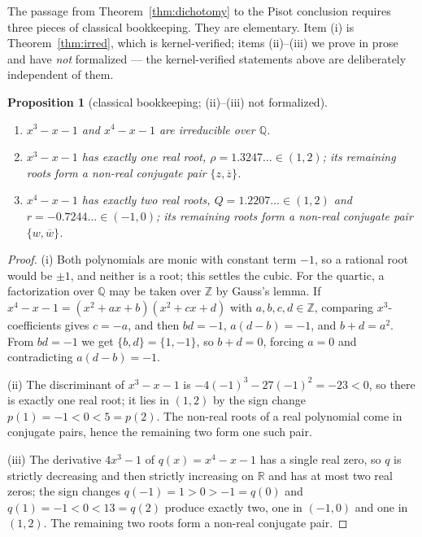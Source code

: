 \documentclass[11pt]{amsart}
\theoremstyle{plain}
\newtheorem{proposition}[theorem]{Proposition}
\theoremstyle{definition}
\theoremstyle{remark}
\begin{document}
The passage from Theorem~\ref{thm:dichotomy} to the Pisot conclusion requires three pieces of classical bookkeeping. They are elementary. Item (i) is Theorem~\ref{thm:irred}, which is kernel-verified; items (ii)--(iii) we prove in prose and have \emph{not} formalized --- the kernel-verified statements above are deliberately independent of them.

\begin{proposition}[classical bookkeeping; (ii)--(iii) not formalized]\label{prop:boundary-bookkeeping}
\begin{enumerate}
\item[(i)] $x^3 - x - 1$ and $x^4 - x - 1$ are irreducible over $\mathbb{Q}$.
\item[(ii)] $x^3 - x - 1$ has exactly one real root, $\rho = 1.3247\ldots \in (1, 2)$; its remaining roots form a non-real conjugate pair $\{z, \overline{z}\}$.
\item[(iii)] $x^4 - x - 1$ has exactly two real roots, $Q = 1.2207\ldots \in (1, 2)$ and $r = -0.7244\ldots \in (-1, 0)$; its remaining roots form a non-real conjugate pair $\{w, \overline{w}\}$.
\end{enumerate}
\end{proposition}

\begin{proof}
(i) Both polynomials are monic with constant term $-1$, so a rational root would be $\pm 1$, and neither is a root; this settles the cubic. For the quartic, a factorization over $\mathbb{Q}$ may be taken over $\mathbb{Z}$ by Gauss's lemma. If $x^4 - x - 1 = (x^2 + a x + b)(x^2 + c x + d)$ with $a, b, c, d \in \mathbb{Z}$, comparing $x^3$-coefficients gives $c = -a$, and then $b d = -1$, $a(d - b) = -1$, and $b + d = a^2$. From $b d = -1$ we get $\{b, d\} = \{1, -1\}$, so $b + d = 0$, forcing $a = 0$ and contradicting $a(d - b) = -1$.

(ii) The discriminant of $x^3 - x - 1$ is $-4(-1)^3 - 27(-1)^2 = -23 < 0$, so there is exactly one real root; it lies in $(1, 2)$ by the sign change $p(1) = -1 < 0 < 5 = p(2)$. The non-real roots of a real polynomial come in conjugate pairs, hence the remaining two form one such pair.

(iii) The derivative $4x^3 - 1$ of $q(x) = x^4 - x - 1$ has a single real zero, so $q$ is strictly decreasing and then strictly increasing on $\mathbb{R}$ and has at most two real zeros; the sign changes $q(-1) = 1 > 0 > -1 = q(0)$ and $q(1) = -1 < 0 < 13 = q(2)$ produce exactly two, one in $(-1, 0)$ and one in $(1, 2)$. The remaining two roots form a non-real conjugate pair.
\end{proof}
\end{document}
